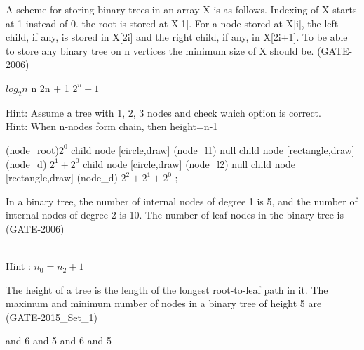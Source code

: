 \begin{questyle}
  \question  A scheme for storing binary trees in an array X is as follows. Indexing of X
            starts at 1 instead of 0. the root is stored at X[1]. For a node stored at X[i], the
            left child, if any, is stored in X[2i] and the right child, if any, in X[2i+1]. To
            be able to store any binary tree on n vertices the minimum size of X should be.  (GATE-2006)

  \begin{oneparchoices}
    \choice         \(log_2n\)
    \choice         n
    \choice         2n + 1
    \CorrectChoice  \(2^n - 1\)
  \end{oneparchoices}

  Hint: Assume a tree with 1, 2, 3 nodes and check which option is correct.\\
  Hint: When n-nodes form chain, then height=n-1

    \begin{myTreeLThree}
       (node_root){\(2^0\)}
        child
        {
            node [circle,draw] (node_l1) {null}
        }
        child
        {
            node [rectangle,draw] (node_d){ \(2^1 + 2^0\) }
            child
            {
                node [circle,draw] (node_l2) {null}
            }
            child
            {
                node [rectangle,draw] (node_d){ \(2^2 + 2^1 + 2^0\) }
            }
        };
    \end{myTreeLThree}

\end{questyle}

\begin{questyle}
  \question  In a binary tree, the number of internal nodes of degree 1 is 5, and the number of
             internal nodes of degree 2 is 10. The number of leaf nodes in the binary tree is  (GATE-2006)

  \begin{oneparchoices}
  \end{oneparchoices}
   \\ Hint :  \( n_0 =  n_2 + 1 \)
  \end{questyle}

\begin{questyle}
  \question  The height of a tree is the length of the longest root-to-leaf path in it. The
             maximum and minimum number of nodes in a binary tree of height 5 are  (GATE-2015\_Set\_1)

  \begin{oneparchoices}
     and 6
     and 5
     and 6
     and 5
  \end{oneparchoices}
\end{questyle}


